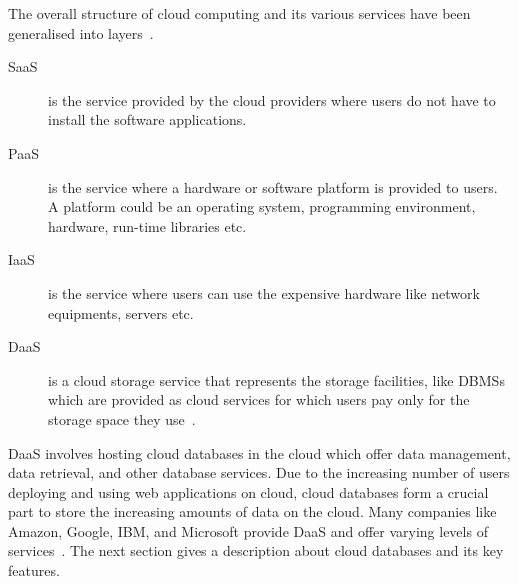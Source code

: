 The overall structure of cloud computing and its various services have been
generalised into layers~\citep{Buyya,Spring1,Spring2}.

\begin{description}
	\item [\acf{SaaS}] is the service provided by the cloud
	providers where users do not have to install the software applications. 
	
	\item [\acf{PaaS}] is the service where a hardware or
	software platform is provided to users.  A platform could be an operating system,  
	programming environment,   hardware,   run-time libraries etc. 
	
	\item [\acf{IaaS}] is the service where users can use
	the expensive hardware like network equipments,   servers etc. 
	
	\item [\acf{DaaS}] is a cloud storage service  that represents
	the storage facilities,   like  \acp{DBMS} which are provided
	as cloud services for which users pay only for the storage space they
	use~\citep{Mateljan,Wuetal}.

\end{description}


\ac{DaaS} involves hosting cloud databases in the cloud which offer data
management,   data retrieval,   and other database services.  Due to the
increasing number of users deploying and using web applications on cloud, cloud
databases form a crucial part to store the increasing amounts of data on the
cloud.  Many companies like Amazon,   Google,   IBM,   and Microsoft provide
\ac{DaaS} and offer varying levels of services~\citep{Mateljan}. The next
section gives a description about cloud databases and its key features.


